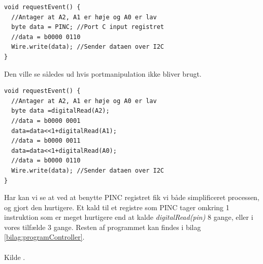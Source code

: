 \begin{lstlisting}
void requestEvent() {
  //Antager at A2, A1 er høje og A0 er lav 
  byte data = PINC; //Port C input registret
  //data = b0000 0110
  Wire.write(data); //Sender dataen over I2C
}
\end{lstlisting}
Den ville se således ud hvis portmanipulation ikke bliver brugt.
\begin{lstlisting}
void requestEvent() {
  //Antager at A2, A1 er høje og A0 er lav 
  byte data =digitalRead(A2);
  //data = b0000 0001
  data=data<<1+digitalRead(A1);
  //data = b0000 0011
  data=data<<1+digitalRead(A0);
  //data = b0000 0110
  Wire.write(data); //Sender dataen over I2C
}
\end{lstlisting}
Har kan vi se at ved at benytte PINC registret fik vi både simplificeret processen, og gjort den hurtigere. Et kald til et registre som PINC tager omkring 1 instruktion som er meget hurtigere end at kalde \textit{digitalRead(pin)} 8 gange, eller i vores tilfælde 3 gange. Resten af programmet kan findes i bilag \ref{bilag:programController}.\\
\\
Kilde \cite{arduino:port}.
